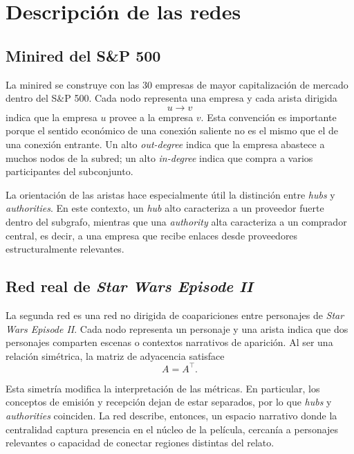 \section{Descripción de las redes}

\subsection{Minired del S\&P 500}

La minired se construye con las 30 empresas de mayor capitalización de mercado dentro del S\&P 500. Cada nodo representa una empresa y cada arista dirigida
\[
 u\to v
\]
indica que la empresa $u$ provee a la empresa $v$. Esta convención es importante porque el sentido económico de una conexión saliente no es el mismo que el de una conexión entrante. Un alto \textit{out-degree} indica que la empresa abastece a muchos nodos de la subred; un alto \textit{in-degree} indica que compra a varios participantes del subconjunto.

La orientación de las aristas hace especialmente útil la distinción entre \textit{hubs} y \textit{authorities}. En este contexto, un \textit{hub} alto caracteriza a un proveedor fuerte dentro del subgrafo, mientras que una \textit{authority} alta caracteriza a un comprador central, es decir, a una empresa que recibe enlaces desde proveedores estructuralmente relevantes.

\subsection{Red real de \textit{Star Wars Episode II}}

La segunda red es una red no dirigida de coapariciones entre personajes de \textit{Star Wars Episode II}. Cada nodo representa un personaje y una arista indica que dos personajes comparten escenas o contextos narrativos de aparición. Al ser una relación simétrica, la matriz de adyacencia satisface
\[
A=A^{\top}.
\]

Esta simetría modifica la interpretación de las métricas. En particular, los conceptos de emisión y recepción dejan de estar separados, por lo que \textit{hubs} y \textit{authorities} coinciden. La red describe, entonces, un espacio narrativo donde la centralidad captura presencia en el núcleo de la película, cercanía a personajes relevantes o capacidad de conectar regiones distintas del relato.
